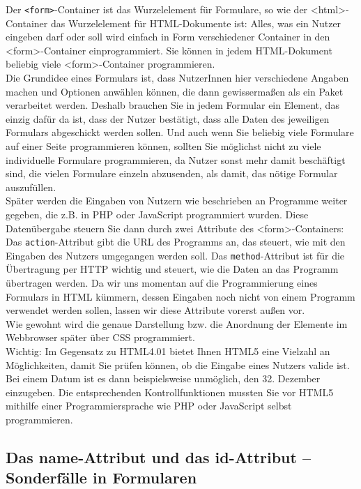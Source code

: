 Der \verb|<form>|-Container ist das Wurzelelement für Formulare, so wie der <html>-Container das Wurzelelement für HTML-Dokumente ist: Alles, was ein Nutzer eingeben darf oder soll wird einfach in Form verschiedener Container in den <form>-Container einprogrammiert. Sie können in jedem HTML-Dokument beliebig viele <form>-Container programmieren.\\

Die Grundidee eines Formulars ist, dass NutzerInnen hier verschiedene Angaben machen und Optionen anwählen können, die dann gewissermaßen als ein Paket verarbeitet werden. Deshalb brauchen Sie in jedem Formular ein Element, das einzig dafür da ist, dass der Nutzer bestätigt, dass alle Daten des jeweiligen Formulars abgeschickt werden sollen. Und auch wenn Sie beliebig viele Formulare auf einer Seite programmieren können, sollten Sie möglichst nicht zu viele individuelle Formulare programmieren, da Nutzer sonst mehr damit beschäftigt sind, die vielen Formulare einzeln abzusenden, als damit, das nötige Formular auszufüllen.\\

Später werden die Eingaben von Nutzern wie beschrieben an Programme weiter gegeben, die z.B. in PHP oder JavaScript programmiert wurden. Diese Datenübergabe steuern Sie dann durch zwei Attribute des <form>-Containers: Das \verb|action|-Attribut gibt die URL des Programms an, das steuert, wie mit den Eingaben des Nutzers umgegangen werden soll. Das \verb|method|-Attribut ist für die Übertragung per HTTP wichtig und steuert, wie die Daten an das Programm übertragen werden. Da wir uns momentan auf die Programmierung eines Formulars in HTML kümmern, dessen Eingaben noch nicht von einem Programm verwendet werden sollen, lassen wir diese Attribute vorerst außen vor.\\

Wie gewohnt wird die genaue Darstellung bzw. die Anordnung der Elemente im Webbrowser später über CSS programmiert.\\

Wichtig: Im Gegensatz zu HTML4.01 bietet Ihnen HTML5 eine Vielzahl an Möglichkeiten, damit Sie prüfen können, ob die Eingabe eines Nutzers valide ist. Bei einem Datum ist es dann beispielsweise unmöglich, den 32. Dezember einzugeben. Die entsprechenden Kontrollfunktionen mussten Sie vor HTML5 mithilfe einer Programmiersprache wie PHP oder JavaScript selbst programmieren.

\subsection{Das name-Attribut und das id-Attribut – Sonderfälle in Formularen}

